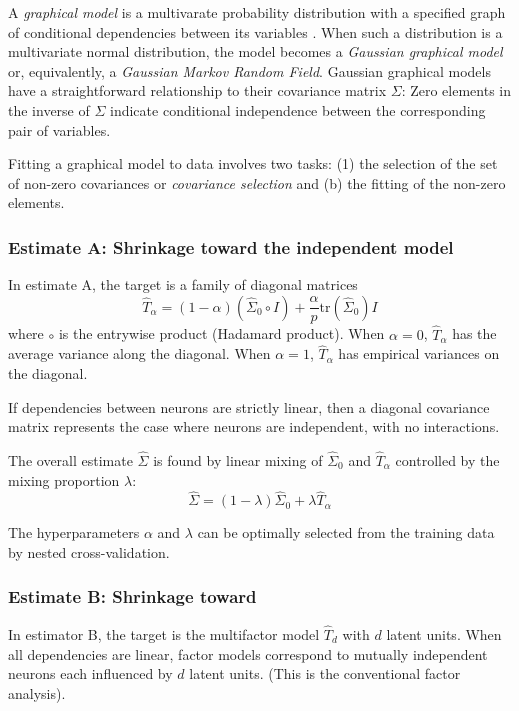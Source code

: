 A \emph{graphical model} is a multivarate probability distribution with a specified graph of conditional dependencies between its variables \cite{Koller:2009}.  When such a distribution is a multivariate normal distribution, the model becomes a \emph{Gaussian graphical model} or, equivalently, a \emph{Gaussian Markov Random Field}.  Gaussian graphical models have a straightforward relationship to their covariance matrix $\Sigma$:  Zero elements in the inverse of $\Sigma$ indicate conditional independence between the corresponding pair of variables.  

Fitting a graphical model to data involves two tasks: (1) the selection of the set of non-zero covariances or \emph{covariance selection} \cite{Dempster:1972} and (b) the fitting of the non-zero elements.

\subsubsection*{Estimate A: Shrinkage toward the independent model}
In estimate A, the target is a family of diagonal matrices 
\begin{equation}
\hat T_\alpha = (1-\alpha)(\hat\Sigma_0 \circ I) + \frac \alpha p \mbox{tr}(\hat \Sigma_0)I
\end{equation}
where $\circ$ is the entrywise product (Hadamard product). When $\alpha=0$, $\hat T_\alpha$ has the average variance along the diagonal. When $ \alpha=1$, $ \hat T_\alpha$ has empirical variances on the diagonal.

If dependencies between neurons are strictly linear, then a diagonal covariance matrix represents the case where neurons are independent, with no interactions.

The overall estimate $\hat\Sigma$ is found by linear mixing of $\hat\Sigma_0$ and $ \hat T_\alpha$ controlled by the mixing proportion $\lambda$:
\begin{equation}
\hat\Sigma = (1-\lambda)\hat\Sigma_0 + \lambda\hat T_\alpha 
\end{equation}

The hyperparameters $ \alpha$ and $ \lambda$ can be optimally selected from the training data by nested cross-validation.

\subsubsection*{Estimate B: Shrinkage toward }
In estimator B, the target is the multifactor model $ \hat T_d$ with $ d$ latent units. When all dependencies are linear, factor models correspond to mutually independent neurons each influenced by $ d$ latent units. (This is  the conventional factor analysis).

